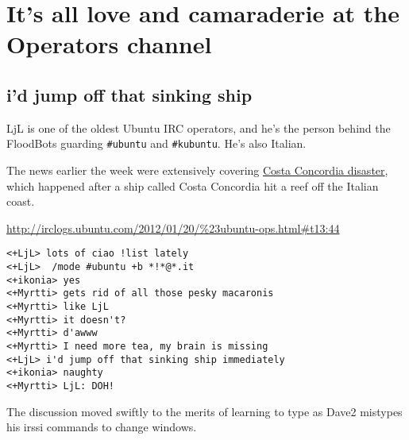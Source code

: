 \chapter{It's all love and camaraderie at the Operators channel}

\section*{i'd jump off that sinking ship}

LjL is one of the oldest Ubuntu IRC operators, and he's the person behind
the FloodBots guarding \verb$#ubuntu$ and \verb$#kubuntu$. He's also Italian.

The news earlier the week were extensively covering 
\href{http://en.wikipedia.org/wiki/Costa_Concordia_disaster}{Costa Concordia disaster},
which happened after a ship called Costa Concordia hit a reef off the Italian coast.

\url{http://irclogs.ubuntu.com/2012/01/20/%23ubuntu-ops.html#t13:44}
\begin{verbatim}
<+LjL> lots of ciao !list lately
<+LjL>  /mode #ubuntu +b *!*@*.it
<+ikonia> yes
<+Myrtti> gets rid of all those pesky macaronis
<+Myrtti> like LjL
<+Myrtti> it doesn't?
<+Myrtti> d'awww
<+Myrtti> I need more tea, my brain is missing
<+LjL> i'd jump off that sinking ship immediately
<+ikonia> naughty
<+Myrtti> LjL: DOH!
\end{verbatim}

The discussion moved swiftly to the merits of learning to type as Dave2
mistypes his irssi commands to change windows. 
